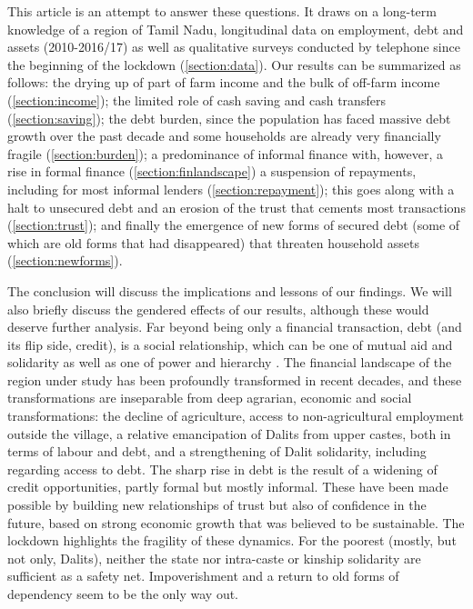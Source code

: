 \documentclass[a4paper, 11pt, onecolumn]{article}
\begin{document}
This article is an attempt to answer these questions. It draws on a long-term knowledge of a region of Tamil Nadu, longitudinal data on employment, debt and assets (2010-2016/17) as well as qualitative surveys conducted by telephone since the beginning of the lockdown (\ref{section:data}). Our results can be summarized as follows: the drying up of part of farm income and the bulk of off-farm income (\ref{section:income}); the limited role of cash saving and cash transfers (\ref{section:saving}); the debt burden, since the population has faced massive debt growth over the past decade and some households are already very financially fragile (\ref{section:burden}); a predominance of informal finance with, however, a rise in formal finance (\ref{section:finlandscape}) a suspension of repayments, including for most informal lenders (\ref{section:repayment}); this goes along with a halt to unsecured debt and an erosion of the trust that cements most transactions (\ref{section:trust}); and finally the emergence of new forms of secured debt (some of which are old forms that had disappeared) that threaten household assets (\ref{section:newforms}).

The conclusion will discuss the implications and lessons of our findings. We will also briefly discuss the gendered effects of our results, although these would deserve further analysis. Far beyond being only a financial transaction, debt (and its flip side, credit), is a social relationship, which can be one of mutual aid and solidarity as well as one of power and hierarchy \citep{Mauss1993, Peebles2010}. The financial landscape of the region under study has been profoundly transformed in recent decades, and these transformations are inseparable from deep agrarian, economic and social transformations: the decline of agriculture, access to non-agricultural employment outside the village, a relative emancipation of Dalits from upper castes, both in terms of labour and debt, and a strengthening of Dalit solidarity, including regarding access to debt. The sharp rise in debt is the result of a widening of credit opportunities, partly formal but mostly informal. These have been made possible by building new relationships of trust but also of confidence in the future, based on strong economic growth that was believed to be sustainable. The lockdown highlights the fragility of these dynamics. For the poorest (mostly, but not only, Dalits), neither the state nor intra-caste or kinship solidarity are sufficient as a safety net. Impoverishment and a return to old forms of dependency seem to be the only way out.
\end{document}
